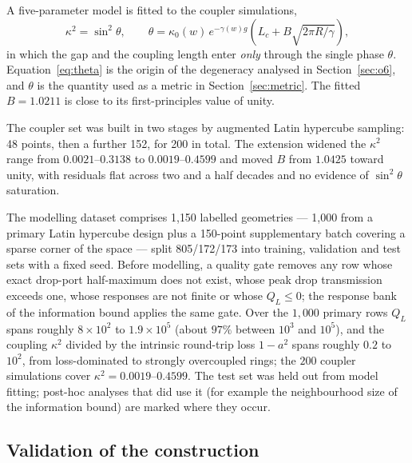 \documentclass[11pt]{article}
\newcommand{\QL}{Q_L}
\begin{document}
A five-parameter model is fitted to the coupler simulations,
\begin{equation}
\kappa^2 = \sin^2\theta,
\qquad
\theta = \kappa_0(w)\,e^{-\gamma(w) g}
\left(L_c + B\sqrt{2\pi R/\gamma}\right),
\label{eq:theta}
\end{equation}
in which the gap and the coupling length enter \emph{only} through the single
phase $\theta$. Equation~\eqref{eq:theta} is the origin of the degeneracy
analysed in Section~\ref{sec:o6}, and $\theta$ is the quantity used as a
metric in Section~\ref{sec:metric}. The fitted $B = 1.0211$ is close to its
first-principles value of unity.

The coupler set was built in two stages by augmented Latin hypercube sampling:
48 points, then a further 152, for 200 in total. The extension widened the
$\kappa^2$ range from $0.0021$--$0.3138$ to $0.0019$--$0.4599$ and moved $B$
from $1.0425$ toward unity, with residuals flat across two and a half decades
and no evidence of $\sin^2\theta$ saturation.

The modelling dataset comprises 1{,}150 labelled geometries --- 1{,}000 from a
primary Latin hypercube design plus a 150-point supplementary batch covering a
sparse corner of the space --- split 805/172/173 into training, validation and test sets with a fixed seed. Before modelling, a quality gate removes any row whose exact drop-port half-maximum does not exist, whose peak drop transmission exceeds one, whose responses are not finite or whose $\QL \le 0$; the response bank of the information bound applies the same gate. Over the $1{,}000$ primary rows $\QL$ spans roughly $8\times10^{2}$ to $1.9\times10^{5}$ (about $97\%$ between $10^{3}$ and $10^{5}$), and the coupling $\kappa^2$ divided by the intrinsic round-trip loss $1-a^2$ spans roughly $0.2$ to $10^{2}$, from loss-dominated to strongly overcoupled rings; the $200$ coupler simulations cover $\kappa^2 = 0.0019$--$0.4599$. The test set was held out from model fitting; post-hoc analyses that did use it (for example the neighbourhood size of the information bound) are marked where they occur.

\subsection{Validation of the construction}
\end{document}
